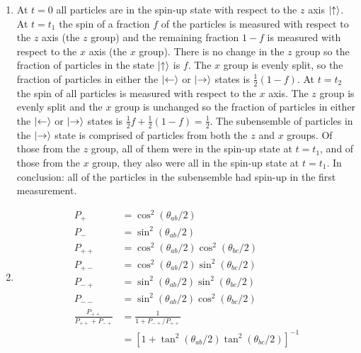 \documentclass{article}
\begin{document}
\begin{enumerate}
  \item

        At $t = 0$ all particles are in the spin-up state with respect to the $z$ axis $\ket{\uparrow}$. At $t = t_1$ the spin of a fraction $f$ of the particles is measured with respect to the $z$ axis (the $z$ group) and the remaining fraction $1 - f$ is measured with respect to the $x$ axis (the $x$ group). There is no change in the $z$ group so the fraction of particles in the state $\ket{\uparrow}$ is $f$. The $x$ group is evenly split, so the fraction of particles in either the $\ket{\leftarrow}$ or $\ket{\rightarrow}$ states is $\frac{1}{2} (1 - f)$. At $t = t_2$ the spin of all particles is measured with respect to the $x$ axis. The $z$ group is evenly split and the $x$ group is unchanged so the fraction of particles in either the $\ket{\leftarrow}$ or $\ket{\rightarrow}$ states is $\frac{1}{2} f + \frac{1}{2} (1 - f) = \frac{1}{2}$. The subensemble of particles in the $\ket{\rightarrow}$ state is comprised of particles from both the $z$ and $x$ groups. Of those from the $z$ group, all of them were in the spin-up state at $t = t_1$, and of those from the $x$ group, they also were all in the spin-up state at $t = t_1$. In conclusion: all of the particles in the subensemble had spin-up in the first measurement.

  \item

        \begin{align*}
          P_+                            & = \cos^2 (\theta_{a b} / 2)                                    \\
          P_-                            & = \sin^2 (\theta_{a b} / 2)                                    \\
          P_{++}                         & = \cos^2 (\theta_{a b} / 2) \cos^2 (\theta_{b c} / 2)          \\
          P_{+-}                         & = \cos^2 (\theta_{a b} / 2) \sin^2 (\theta_{b c} / 2)          \\
          P_{-+}                         & = \sin^2 (\theta_{a b} / 2) \sin^2 (\theta_{b c} / 2)          \\
          P_{--}                         & = \sin^2 (\theta_{a b} / 2) \cos^2 (\theta_{b c} / 2)          \\
          \frac{P_{++}}{P_{++} + P_{-+}} & = \frac{1}{1 + P_{-+} / P_{++}}                                \\
                                         & = [1 + \tan^2 (\theta_{ab} / 2) \tan^2 (\theta_{bc} / 2)]^{-1}
        \end{align*}
\end{enumerate}
\end{document}
